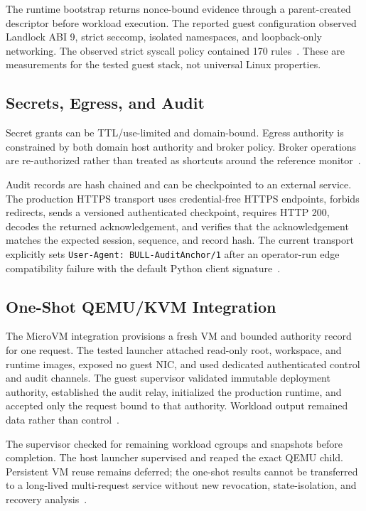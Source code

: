 \documentclass[journal]{IEEEtran}
\begin{document}
The runtime bootstrap returns nonce-bound evidence through a parent-created descriptor before workload execution. The reported guest configuration observed Landlock ABI 9, strict seccomp, isolated namespaces, and loopback-only networking. The observed strict syscall policy contained 170 rules~\cite{BULL_MicroVMReport}. These are measurements for the tested guest stack, not universal Linux properties.

\subsection{Secrets, Egress, and Audit}
Secret grants can be TTL/use-limited and domain-bound. Egress authority is constrained by both domain host authority and broker policy. Broker operations are re-authorized rather than treated as shortcuts around the reference monitor~\cite{BULL_ProdSec,BULL_Dispatcher}.

Audit records are hash chained and can be checkpointed to an external service. The production HTTPS transport uses credential-free HTTPS endpoints, forbids redirects, sends a versioned authenticated checkpoint, requires HTTP 200, decodes the returned acknowledgement, and verifies that the acknowledgement matches the expected session, sequence, and record hash. The current transport explicitly sets \texttt{User-Agent: BULL-AuditAnchor/1} after an operator-run edge compatibility failure with the default Python client signature~\cite{BULL_AuditTransport,BULL_ExternalAudit}.

\subsection{One-Shot QEMU/KVM Integration}
The MicroVM integration provisions a fresh VM and bounded authority record for one request. The tested launcher attached read-only root, workspace, and runtime images, exposed no guest NIC, and used dedicated authenticated control and audit channels. The guest supervisor validated immutable deployment authority, established the audit relay, initialized the production runtime, and accepted only the request bound to that authority. Workload output remained data rather than control~\cite{BULL_GuestEngine,BULL_MicroVMReport,BULL_MicroVMReadme}.

The supervisor checked for remaining workload cgroups and snapshots before completion. The host launcher supervised and reaped the exact QEMU child. Persistent VM reuse remains deferred; the one-shot results cannot be transferred to a long-lived multi-request service without new revocation, state-isolation, and recovery analysis~\cite{BULL_MicroVMReport}.
\end{document}
